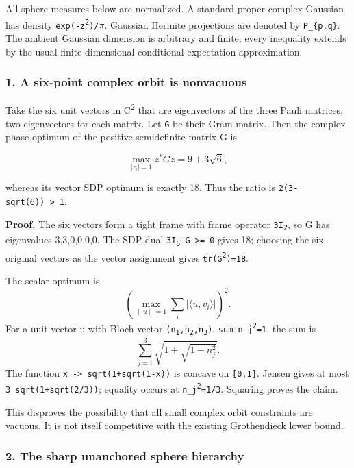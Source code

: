 All sphere measures below are normalized. A standard proper complex
Gaussian has density \texttt{exp(-\textbar{}z\textbar{}\textsuperscript{2})/\ensuremath{\pi}}. Gaussian
Hermite projections are denoted by \texttt{P\_\{p,q\}}. The ambient
Gaussian dimension is arbitrary and finite; every inequality extends by
the usual finite-dimensional conditional-expectation approximation.

\subsubsection{1. A six-point complex orbit is
nonvacuous}\label{a-six-point-complex-orbit-is-nonvacuous}

Take the six unit vectors in C\textsuperscript{2} that are eigenvectors of the three Pauli
matrices, two eigenvectors for each matrix. Let \texttt{G} be their Gram
matrix. Then the complex phase optimum of the positive-semidefinite
matrix G is

\[
 \max_{|z_i|=1}z^*Gz=9+3\sqrt6,
\]

whereas its vector SDP optimum is exactly 18. Thus the ratio is
\texttt{2(3-sqrt(6))\ \textgreater{}\ 1}.

\textbf{Proof.} The six vectors form a tight frame with frame operator
\texttt{3I\textsubscript{2}}, so G has eigenvalues 3,3,0,0,0,0. The SDP dual
\texttt{3I\textsubscript{6}-G\ \textgreater{}=\ 0} gives 18; choosing the six original
vectors as the vector assignment gives \texttt{tr(G\textsuperscript{2})=18}.

The scalar optimum is \[
 \left(\max_{\|u\|=1}\sum_i|\langle u,v_i\rangle|\right)^2.
\] For a unit vector u with Bloch vector \texttt{(n\textsubscript{1},n\textsubscript{2},n\textsubscript{3})},
\texttt{sum\ n\_j\textsuperscript{2}=1}, the sum is \[
 \sum_{j=1}^3\sqrt{1+\sqrt{1-n_j^2}}.
\] The function \texttt{x\ -\textgreater{}\ sqrt(1+sqrt(1-x))} is
concave on \texttt{{[}0,1{]}}. Jensen gives at most
\texttt{3\ sqrt(1+sqrt(2/3))}; equality occurs at \texttt{n\_j\textsuperscript{2}=1/3}.
Squaring proves the claim.

This disproves the possibility that all small complex orbit constraints
are vacuous. It is not itself competitive with the existing Grothendieck
lower bound.

\subsubsection{2. The sharp unanchored sphere
hierarchy}\label{the-sharp-unanchored-sphere-hierarchy}

